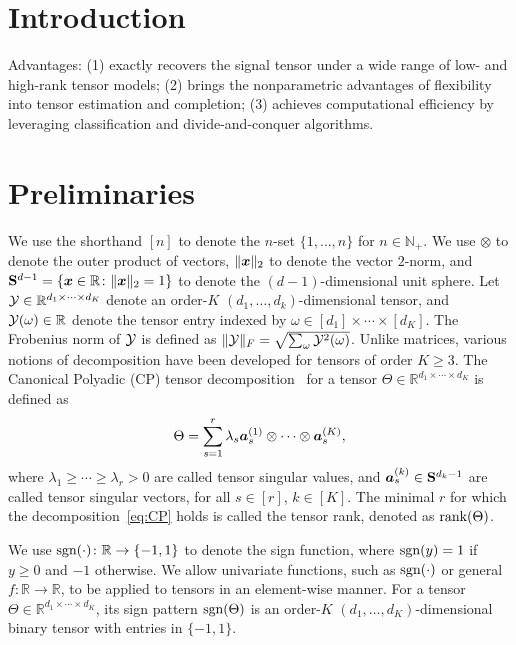 \documentclass{article}
\theoremstyle{plain}
\theoremstyle{definition}
\def\sign{\textup{sgn}}
\def\rank{\textup{rank}}
\begin{document}
\section{Introduction}\label{Intro}

Advantages:
(1) exactly recovers the signal tensor under a wide range of low- and high-rank tensor models; 
(2) brings the nonparametric advantages of flexibility into tensor estimation and completion; 
(3) achieves computational efficiency by leveraging classification and divide-and-conquer algorithms.

\section{Preliminaries}
We use the shorthand $[n]$ to denote the $n$-set $\{1,\ldots,n\}$ for $n\in\mathbb{N}_{+}$. We use $\otimes$ to denote the outer product of vectors, $\lVert\bm x\rVert_2$ to denote the vector $2$-norm, and $\mathbf{S}^{d-1}=\{\bm x\in\mathbb{R}\colon \lVert\bm x\rVert_2=1\}$ to denote the $(d-1)$-dimensional unit sphere. Let $\mathcal{Y}\in\mathbb{R}^{d_1\times \cdots \times d_K}$ denote an order-$K$ $(d_1,\ldots,d_k)$-dimensional tensor, and $\mathcal{Y}(\omega)\in\mathbb{R}$ denote the tensor entry indexed by $\omega \in[d_1]\times \cdots \times [d_K]$. The Frobenius norm of $\mathcal{Y}$ is defined as $\lVert\mathcal{Y}\rVert_F=\sqrt{\sum_{\omega}\mathcal{Y}^2(\omega)}$. Unlike matrices, various notions of decomposition have been developed for tensors of order $K\geq 3$. The Canonical Polyadic (CP) tensor decomposition~\cite{hitchcock1927expression} for a tensor $\Theta\in\mathbb{R}^{d_1\times \cdots \times d_K}$ is defined as
\begin{equation}\label{eq:CP}
\Theta=\sum_{s=1}^r\lambda_s \bm{a}^{(1)}_s\otimes\cdots\otimes \bm{a}^{(K)}_s,
\end{equation}
where $\lambda_1\geq \cdots \geq \lambda_r>0$ are called tensor singular values, and $\bm{a}^{(k)}_s \in \mathbf{S}^{d_k-1}$ are called tensor singular vectors, for all $s\in[r]$, $k\in[K]$. The minimal $r$ for which the decomposition~\eqref{eq:CP} holds is called the tensor rank, denoted as $\rank(\Theta)$. 

We use $\sign(\cdot)\colon \mathbb{R}\to\{-1,1\}$ to denote the sign function, where $\sign(y)=1$ if $y\geq 0$ and $-1$ otherwise. We allow univariate functions, such as $\sign(\cdot)$ or general $f\colon \mathbb{R}\to\mathbb{R}$, to be applied to tensors in an element-wise manner. For a tensor $\Theta\in\mathbb{R}^{d_1\times \cdots \times d_K}$, its sign pattern $\sign(\Theta)$ is an order-$K$ $(d_1,\ldots,d_K)$-dimensional binary tensor with entries in $\{-1,1\}$. 
\end{document}
